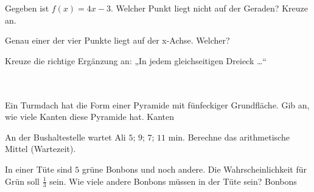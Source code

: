 \documentclass[11pt]{article}
\begin{document}
\begin{aufgabe}{Gegeben ist $f(x) = 4x - 3$. Welcher Punkt liegt nicht auf der Geraden? Kreuze an. \\   }
\end{aufgabe}

\begin{aufgabe}{Genau einer der vier Punkte liegt auf der x-Achse. Welcher? \\    }
\end{aufgabe}

\begin{aufgabe}{Kreuze die richtige Ergänzung an: „In jedem gleichseitigen Dreieck …“\\ \\ \\ }
\end{aufgabe}

\begin{aufgabe}{Ein Turmdach hat die Form einer Pyramide mit fünfeckiger Grundfläche. Gib an, wie viele Kanten diese Pyramide hat. \leerfeld Kanten}
\end{aufgabe}

\begin{aufgabe}{An der Bushaltestelle wartet Ali $5$; $9$; $7$; $11$ min. Berechne das arithmetische Mittel (Wartezeit). \leerfeld[min]}
\end{aufgabe}

\begin{aufgabe}{In einer Tüte sind $5$ grüne Bonbons und noch andere. Die Wahrscheinlichkeit für Grün soll $\frac{1}{3}$ sein. Wie viele andere Bonbons müssen in der Tüte sein? \leerfeld Bonbons}
\end{aufgabe}
\end{document}
